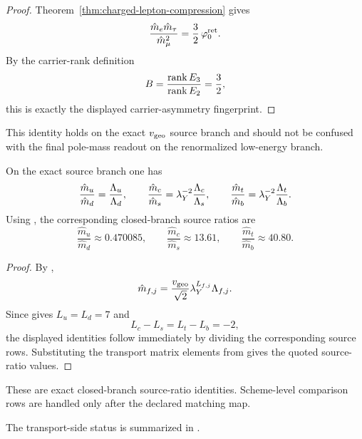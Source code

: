 \begin{proof}
Theorem~\ref{thm:charged-lepton-compression} gives
\[
\frac{\hat m_e \hat m_\tau}{\hat m_\mu^2}=\frac32\,\varphi_0^{\mathrm{ret}}.
\]
By the carrier-rank definition
\[
B=\frac{\operatorname{rank} E_3}{\operatorname{rank} E_2}=\frac32,
\]
this is exactly the displayed carrier-asymmetry fingerprint.
\end{proof}

\begin{remark}
This identity holds on the exact $v_{\mathrm{geo}}$ source branch and should not be confused with the final
pole-mass readout on the renormalized low-energy branch.
\end{remark}

\begin{corollary}
\label{cor:quark-source-ratios}
On the exact source branch one has
\[
\frac{\hat m_u}{\hat m_d}=\frac{\Lambda_u}{\Lambda_d},
\qquad
\frac{\hat m_c}{\hat m_s}=\lambda_Y^{-2}\frac{\Lambda_c}{\Lambda_s},
\qquad
\frac{\hat m_t}{\hat m_b}=\lambda_Y^{-2}\frac{\Lambda_t}{\Lambda_b}.
\]
Using , the corresponding closed-branch source ratios are
\[
\frac{\hat m_u}{\hat m_d}\approx\num{0.470085},
\qquad
\frac{\hat m_c}{\hat m_s}\approx\num{13.61},
\qquad
\frac{\hat m_t}{\hat m_b}\approx\num{40.80}.
\]
\end{corollary}

\begin{proof}
By ,
\[
\hat m_{f,j}=\frac{v_{\mathrm{geo}}}{\sqrt2}\lambda_Y^{L_{f,j}}\Lambda_{f,j}.
\]
Since  gives $L_u=L_d=7$ and
\[
L_c-L_s=L_t-L_b=-2,
\]
the displayed identities follow immediately by dividing the corresponding source rows. Substituting
the transport matrix elements from  gives the quoted source-ratio
values.
\end{proof}

\begin{remark}
These are exact closed-branch source-ratio identities. Scheme-level comparison rows are handled
only after the declared matching map.
\end{remark}

The transport-side status is summarized in .

